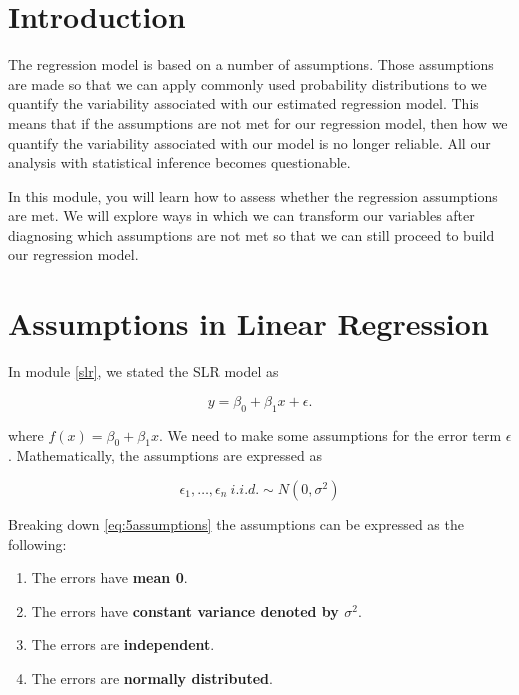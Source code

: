 \documentclass[
]{book}
\providecommand{\tightlist}{%
  \setlength{\itemsep}{0pt}\setlength{\parskip}{0pt}}
\begin{document}
\hypertarget{introduction-4}{%
\section{Introduction}\label{introduction-4}}

The regression model is based on a number of assumptions. Those assumptions are made so that we can apply commonly used probability distributions to we quantify the variability associated with our estimated regression model. This means that if the assumptions are not met for our regression model, then how we quantify the variability associated with our model is no longer reliable. All our analysis with statistical inference becomes questionable.

In this module, you will learn how to assess whether the regression assumptions are met. We will explore ways in which we can transform our variables after diagnosing which assumptions are not met so that we can still proceed to build our regression model.

\hypertarget{assumptions-in-linear-regression}{%
\section{Assumptions in Linear Regression}\label{assumptions-in-linear-regression}}

In module \ref{slr}, we stated the SLR model as

\begin{equation} 
y=\beta_0+\beta_{1} x + \epsilon. 
\label{eq:5SLRmod}
\end{equation}

where \(f(x) = \beta_0 + \beta_1 x\). We need to make some assumptions for the error term \(\epsilon\). Mathematically, the assumptions are expressed as

\begin{equation} 
\epsilon_1,\ldots,\epsilon_n \ i.i.d. \sim N(0,\sigma^2)
\label{eq:5assumptions}
\end{equation}

Breaking down \eqref{eq:5assumptions} the assumptions can be expressed as the following:

\begin{enumerate}
\def\labelenumi{\arabic{enumi}.}
\tightlist
\item
  The errors have \textbf{mean 0}.
\item
  The errors have \textbf{constant variance denoted by \(\sigma^2\)}.
\item
  The errors are \textbf{independent}.
\item
  The errors are \textbf{normally distributed}.
\end{enumerate}
\end{document}
